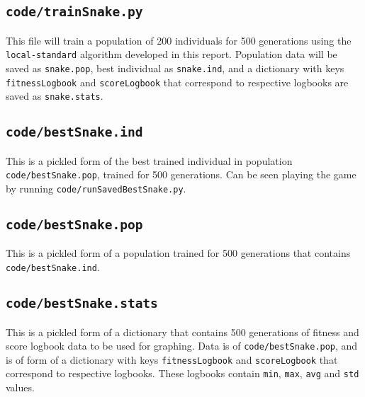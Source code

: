 \subsection{\texttt{code/trainSnake.py}}
This file will train a population of 200 individuals for 500 generations using the \texttt{local-standard} algorithm developed in this report. Population data will be saved as \texttt{snake.pop}, best individual as \texttt{snake.ind}, and a dictionary with keys \texttt{fitnessLogbook} and \texttt{scoreLogbook} that correspond to respective logbooks are saved as \texttt{snake.stats}.
\subsection{\texttt{code/bestSnake.ind}}
This is a pickled form of the best trained individual in population \texttt{code/bestSnake.pop}, trained for 500 generations. Can be seen playing the game by running \texttt{code/runSavedBestSnake.py}.
\subsection{\texttt{code/bestSnake.pop}}
This is a pickled form of a population trained for 500 generations that contains \texttt{code/bestSnake.ind}.
\subsection{\texttt{code/bestSnake.stats}}
This is a pickled form of a dictionary that contains 500 generations of fitness and score logbook data to be used for graphing. Data is of \texttt{code/bestSnake.pop}, and is of form of a dictionary with keys \texttt{fitnessLogbook} and \texttt{scoreLogbook} that correspond to respective logbooks. These logbooks contain \texttt{min}, \texttt{max}, \texttt{avg} and \texttt{std} values.
